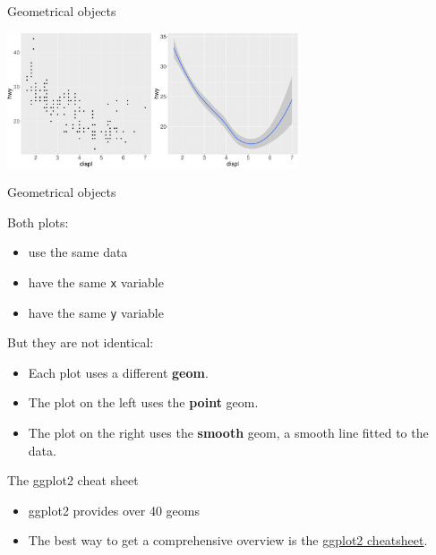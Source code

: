 \documentclass[ignorenonframetext,]{beamer}
\providecommand{\tightlist}{%
  \setlength{\itemsep}{0pt}\setlength{\parskip}{0pt}}
\begin{document}
\begin{frame}{Geometrical objects}
\protect\hypertarget{geometrical-objects-2}{}

\begin{center}\includegraphics[height=150px]{data-visualization_files/figure-beamer/unnamed-chunk-6-1} \end{center}

\end{frame}

\begin{frame}[fragile]{Geometrical objects}
\protect\hypertarget{geometrical-objects-3}{}

Both plots:

\begin{itemize}
\item
  use the same data
\item
  have the same \texttt{x} variable
\item
  have the same \texttt{y} variable
\end{itemize}

But they are not identical:

\begin{itemize}
\item
  Each plot uses a different \textbf{geom}.
\item
  The plot on the left uses the \textbf{point} geom.
\item
  The plot on the right uses the \textbf{smooth} geom, a smooth line
  fitted to the data.
\end{itemize}

\end{frame}

\begin{frame}{The ggplot2 cheat sheet}
\protect\hypertarget{the-ggplot2-cheat-sheet}{}

\begin{itemize}
\tightlist
\item
  ggplot2 provides over 40 geoms
\item
  The best way to get a comprehensive overview is the
  \href{https://rstudio.com/wp-content/uploads/2016/11/ggplot2-cheatsheet-2.1.pdf}{ggplot2
  cheatsheet}.
\end{itemize}

\end{frame}
\end{document}
